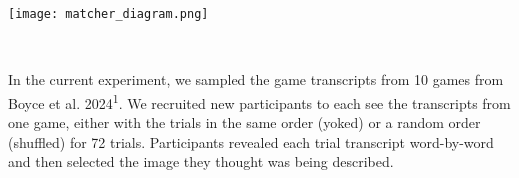 \documentclass[11pt,a4paper]{article}
\begin{document}
\begin{center}\textbf{}\end{center}
%	
%	
%	
%		


\begin{minipage}{.55\textwidth}
	{	\texttt{[image: matcher\_diagram.png]}} 
	\end{minipage}
~~~
\begin{minipage}{.4\textwidth}

\begin{small}
	In the current experiment, we sampled the game transcripts from 10 games from Boyce et al. 2024\textsuperscript{1}. We recruited new participants to each see the transcripts from one game, either with the trials in the same order (yoked) or a random order (shuffled) for 72 trials.  Participants revealed each trial transcript word-by-word and then selected the image they thought was being described. 
	
\end{small}	
\end{minipage}

\bigskip
\end{document}
